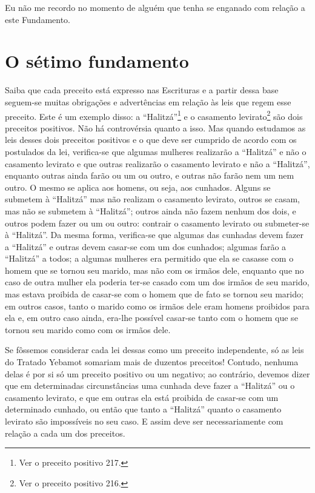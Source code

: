 Eu não me recordo no momento de alguém que tenha se enganado com relação
a este Fundamento.

\chapter*{O sétimo fundamento}

Saiba que cada preceito está expresso nas Escrituras e a partir dessa
base seguem-se muitas obrigações e advertências em relação às leis que
regem esse preceito. Este é um exemplo disso: a
``Halitzá''\footnote{Ver o preceito positivo 217.} e o casamento
levirato\footnote{Ver o preceito positivo 216.} são dois preceitos positivos. Não há
controvérsia quanto a isso. Mas quando estudamos as leis desses dois
preceitos positivos e o que deve ser cumprido de acordo com os
postulados da lei, verifica-se que algumas mulheres realizarão a
``Halitzá'' e não o casamento levirato e que outras realizarão o
casamento levirato e não a ``Halitzá'', enquanto outras ainda farão ou
um ou outro, e outras não farão nem um nem outro. O mesmo se aplica aos
homens, ou seja, aos cunhados. Alguns se submetem à ``Halitzá'' mas não
realizam o casamento levirato, outros se casam, mas não se submetem à
``Halitzá''; outros ainda não fazem nenhum dos dois, e outros podem
fazer ou um ou outro: contrair o casamento levirato ou submeter-se à
``Halitzá''. Da mesma forma, verifica-se que algumas das cunhadas devem
fazer a ``Halitzá'' e outras devem casar-se com um dos cunhados; algumas
farão a ``Halitzá'' a todos; a algumas mulheres era permitido que ela se
casasse com o homem que se tornou seu marido, mas não com os irmãos
dele, enquanto que no caso de outra mulher ela poderia ter-se casado com
um dos irmãos de seu marido, mas estava proibida de casar-se com o homem
que de fato se tornou seu marido; em outros casos, tanto o marido como
os irmãos dele eram homens proibidos para ela e, em outro caso ainda,
era-lhe possível casar-se tanto com o homem que se tornou seu marido
como com os irmãos dele.

Se fôssemos considerar cada lei dessas como um preceito independente,
só as leis do Tratado Yebamot somariam mais de duzentos preceitos!
Contudo, nenhuma delas é por si só um preceito positivo ou um negativo;
ao contrário, devemos dizer que em determinadas circunstâncias uma
cunhada deve fazer a ``Halitzá'' ou o casamento levirato, e que em
outras ela está proibida de casar-se com um determinado cunhado, ou
então que tanto a ``Halitzá'' quanto o casamento levirato são
impossíveis no seu caso. E assim deve ser necessariamente com relação a
cada um dos preceitos.

